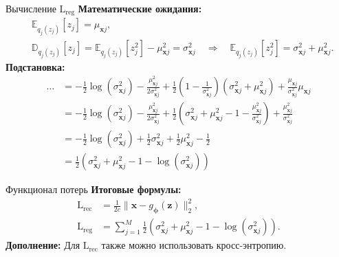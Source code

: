\begin{frame}[allowframebreaks]{Вычисление $\text{L}_{\text{reg}}$}
    \textbf{Математические ожидания:}
    \begin{align*}
        & \mathbb{E}_{q_j(z_j)}\left[z_j \right] = \mu_{\boldsymbol{x}j}, \\
        & \mathbb{D}_{q_j(z_j)}\left[z_j \right] = \mathbb{E}_{q_j(z_j)}\left[z_j^2 \right] - \mu_{\boldsymbol{x}j}^2 = \sigma_{\boldsymbol{x}j}^2 \quad\Rightarrow\quad\mathbb{E}_{q_j(z_j)}\left[z_j^2 \right] = \sigma_{\boldsymbol{x}j}^2 + \mu_{\boldsymbol{x}j}^2.
    \end{align*}
    \textbf{Подстановка:}
    \begin{align*}
        \ldots 
        &= -\frac{1}{2}\log(\sigma_{\boldsymbol{x}j}^2) - \frac{\mu_{\boldsymbol{x}j}^2}{2\sigma_{\boldsymbol{x}j}^2} + \frac{1}{2}\left(1 - \frac{1}{\sigma_{\boldsymbol{x}j}^2}\right)(\sigma_{\boldsymbol{x}j}^2 + \mu_{\boldsymbol{x}j}^2) + \frac{\mu_{\boldsymbol{x}j}}{\sigma_{\boldsymbol{x}j}^2} \mu_{\boldsymbol{x}j} \\
        &= -\frac{1}{2}\log(\sigma_{\boldsymbol{x}j}^2) - \frac{\mu_{\boldsymbol{x}j}^2}{2\sigma_{\boldsymbol{x}j}^2} + \frac{1}{2}\left(\sigma_{\boldsymbol{x}j}^2 + \mu_{\boldsymbol{x}j}^2 - 1 - \frac{\mu_{\boldsymbol{x}j}^2}{\sigma_{\boldsymbol{x}j}^2} \right) + \frac{\mu_{\boldsymbol{x}j}^2}{\sigma_{\boldsymbol{x}j}^2} \\
        &= -\frac{1}{2}\log(\sigma_{\boldsymbol{x}j}^2) + \frac{1}{2}\sigma_{\boldsymbol{x}j}^2 + \frac{1}{2}\mu_{\boldsymbol{x}j}^2 - \frac{1}{2} \\
        &= \frac{1}{2}\left( \sigma_{\boldsymbol{x}j}^2 + \mu_{\boldsymbol{x}j}^2 - 1 - \log(\sigma_{\boldsymbol{x}j}^2) \right)
    \end{align*}
\end{frame}

\begin{frame}{Функционал потерь}
    \textbf{Итоговые формулы:}
    \begin{align*}
        \text{L}_{\text{rec}} &= \frac{1}{2c}\|\boldsymbol{x} - g_{\boldsymbol{\phi}}(\boldsymbol{z})\|^2_2, \\
        \text{L}_{\text{reg}} &= \sum_{j=1}^M \frac{1}{2}\left( \sigma_{\boldsymbol{x}j}^2 + \mu_{\boldsymbol{x}j}^2 - 1 - \log(\sigma_{\boldsymbol{x}j}^2) \right).
    \end{align*}
    \textbf{Дополнение:} Для $\text{L}_{\text{rec}}$ также можно использовать кросс-энтропию.
\end{frame}

